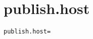 \section{publish.host}
\label{configuration:PublishHost}
\ClearAPI
\TODO
\begin{lstlisting}[style=Props,caption={Usage example for \textit{publish.host}}]
publish.host=
\end{lstlisting}